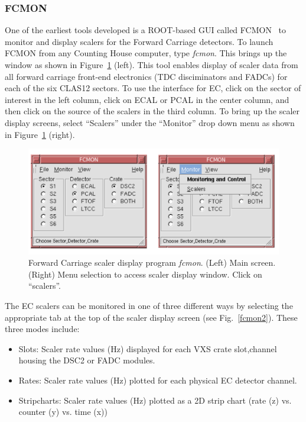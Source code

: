 \documentclass[letterpaper,10pt]{article}
\begin{document}
\subsubsection{FCMON}
One of the earliest tools developed
is a ROOT-based GUI called FCMON~\cite{fcmon} to monitor and display scalers for the
Forward Carriage detectors.   To launch FCMON from any Counting House computer, type {\it fcmon}.
This brings up the window as shown in Figure~\ref{fcmon1} (left). This tool enables display of
scaler data from all forward carriage front-end electronics (TDC disciminators and FADCs) for each of the six CLAS12 sectors. To
use the interface for EC, click on the sector of interest in the left column, click on ECAL or PCAL in
the center column, and then click on the source of the scalers in the third column. To bring
up the scaler display screens, select ``Scalers'' under the ``Monitor'' drop down menu as
shown in Figure~\ref{fcmon1} (right).
 
\begin{figure}[htbp]
  \centering
  \includegraphics[width= 6in, keepaspectratio = true]{fcmon-1}
  \vspace{2mm}
  \caption{Forward Carriage scaler display program {\it fcmon}. (Left) Main screen. (Right) Menu selection to
    access scaler display window.  Click on ``scalers''.}
\label{fcmon1}
\end{figure}

The EC scalers can be monitored in one of three different ways by selecting the appropriate tab
at the top of the scaler display screen (see Fig.~\ref{fcmon2}). These three modes include:

\begin{itemize}
\item Slots: Scaler rate values (Hz) displayed for each VXS crate slot,channel housing the DSC2 or FADC modules.
\item Rates: Scaler rate values (Hz) plotted for each physical EC detector channel.
\item Stripcharts: Scaler rate values (Hz) plotted as a 2D strip chart (rate (z) vs. counter (y)  vs. time (x))
\end{itemize}
\end{document}
